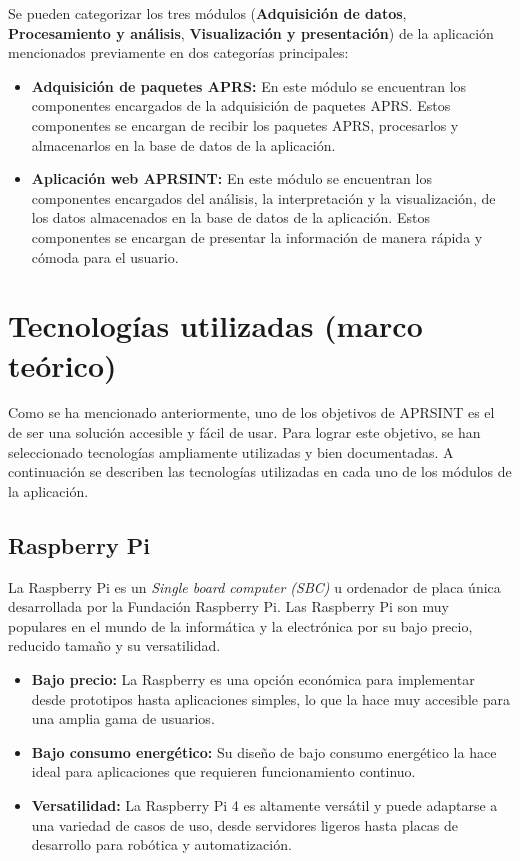 Se pueden categorizar los tres módulos (\textbf{Adquisición de datos}, \textbf{Procesamiento y análisis}, \textbf{Visualización y presentación}) de la aplicación mencionados previamente en dos categorías principales:

\begin{itemize}
	\item \textbf{Adquisición de paquetes APRS:} En este módulo se encuentran los componentes encargados de la adquisición de paquetes APRS. Estos componentes se encargan de recibir los paquetes APRS, procesarlos y almacenarlos en la base de datos de la aplicación.

	\item \textbf{Aplicación web APRSINT:} En este módulo se encuentran los componentes encargados del análisis, la interpretación y la visualización, de los datos almacenados en la base de datos de la aplicación. Estos componentes se encargan de presentar la información de manera rápida y cómoda para el usuario.
\end{itemize}

\section{Tecnologías utilizadas (marco teórico)}

Como se ha mencionado anteriormente, uno de los objetivos de APRSINT es el de ser una solución accesible y fácil de usar. Para lograr este objetivo, se han seleccionado tecnologías ampliamente utilizadas y bien documentadas. A continuación se describen las tecnologías utilizadas en cada uno de los módulos de la aplicación.
\subsection{Raspberry Pi}

La Raspberry Pi es un \textit{Single board computer (SBC)} u ordenador de placa única desarrollada por la Fundación Raspberry Pi. Las Raspberry Pi son muy populares en el mundo de la informática y la electrónica por su bajo precio, reducido tamaño y su versatilidad.

\begin{itemize}
	\item \textbf{Bajo precio:} La Raspberry es una opción económica para implementar desde prototipos hasta aplicaciones simples, lo que la hace muy accesible para una amplia gama de usuarios.
	\item \textbf{Bajo consumo energético:} Su diseño de bajo consumo energético la hace ideal para aplicaciones que requieren funcionamiento continuo.
	\item \textbf{Versatilidad:} La Raspberry Pi 4 es altamente versátil y puede adaptarse a una variedad de casos de uso, desde servidores ligeros hasta placas de desarrollo para robótica y automatización.
\end{itemize}

